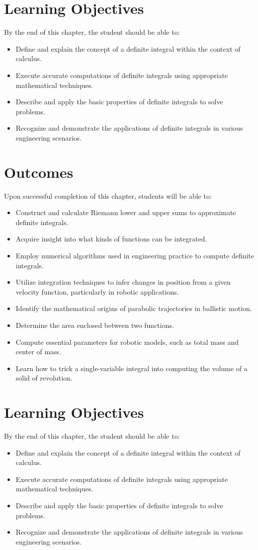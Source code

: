 \section*{Learning Objectives}
By the end of this chapter, the student should be able to:
\begin{itemize}
\item Define and explain the concept of a definite integral within the context of calculus.
\item Execute accurate computations of definite integrals using appropriate mathematical techniques.
\item Describe and apply the basic properties of definite integrals to solve problems.
\item Recognize and demonstrate the applications of definite integrals in various engineering scenarios.
\end{itemize}


\section*{Outcomes}
Upon successful completion of this chapter, students will be able to:
\begin{itemize}
\item Construct and calculate Riemann lower and upper sums to approximate definite integrals.
\item  Acquire insight into what kinds of functions can be integrated.
\item Employ numerical algorithms used in engineering practice to compute definite integrals.
\item Utilize integration techniques to infer changes in position from a given velocity function, particularly in robotic applications.
\item Identify the mathematical origins of parabolic trajectories in ballistic motion.
\item Determine the area enclosed between two functions.
\item Compute essential parameters for robotic models, such as total mass and center of mass.
\item  Learn how to trick a single-variable integral into computing the volume of a solid of revolution.
\end{itemize}

\section*{Learning Objectives}
By the end of this chapter, the student should be able to:
\begin{itemize}
\item Define and explain the concept of a definite integral within the context of calculus.
\item Execute accurate computations of definite integrals using appropriate mathematical techniques.
\item Describe and apply the basic properties of definite integrals to solve problems.
\item Recognize and demonstrate the applications of definite integrals in various engineering scenarios.
\end{itemize}


